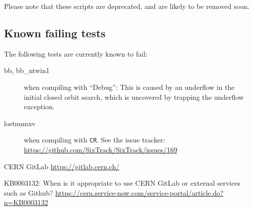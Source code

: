 \documentclass[english,BCOR=0mm,DIV=18]{scrartcl}
\begin{document}
Please note that these scripts are deprecated, and are likely to be removed soon.

\subsection{Known failing tests}
The following tests are currently known to fail:
\begin{description}
\item[bb, bb\_ntwin1] when compiling with ``Debug'': This is caused by an underflow in the initial closed orbit search, which is uncovered by trapping the underflow exception.
\item[lostnumxv] when compiling with \texttt{CR}. See the issue tracker: \url{https://github.com/SixTrack/SixTrack/issues/169}
\end{description}

\begin{thebibliography}{2}

 CERN GitLab \url{https://gitlab.cern.ch/}

 KB0003132: When is it appropriate to use CERN GitLab or external services such as Github? \url{https://cern.service-now.com/service-portal/article.do?n=KB0003132}

\end{thebibliography}
\end{document}
